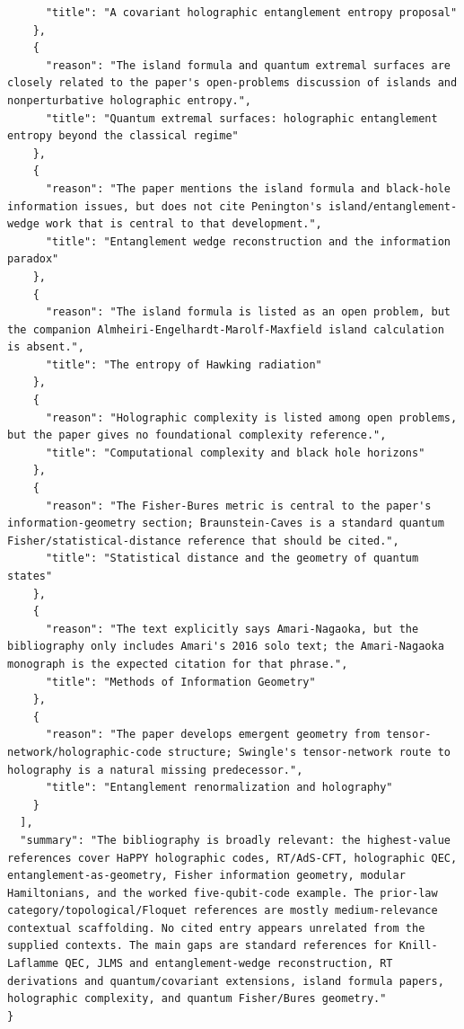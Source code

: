 \documentclass[11pt]{article}
\begin{document}
\begin{verbatim}
      "title": "A covariant holographic entanglement entropy proposal"
    },
    {
      "reason": "The island formula and quantum extremal surfaces are closely related to the paper's open-problems discussion of islands and nonperturbative holographic entropy.",
      "title": "Quantum extremal surfaces: holographic entanglement entropy beyond the classical regime"
    },
    {
      "reason": "The paper mentions the island formula and black-hole information issues, but does not cite Penington's island/entanglement-wedge work that is central to that development.",
      "title": "Entanglement wedge reconstruction and the information paradox"
    },
    {
      "reason": "The island formula is listed as an open problem, but the companion Almheiri-Engelhardt-Marolf-Maxfield island calculation is absent.",
      "title": "The entropy of Hawking radiation"
    },
    {
      "reason": "Holographic complexity is listed among open problems, but the paper gives no foundational complexity reference.",
      "title": "Computational complexity and black hole horizons"
    },
    {
      "reason": "The Fisher-Bures metric is central to the paper's information-geometry section; Braunstein-Caves is a standard quantum Fisher/statistical-distance reference that should be cited.",
      "title": "Statistical distance and the geometry of quantum states"
    },
    {
      "reason": "The text explicitly says Amari-Nagaoka, but the bibliography only includes Amari's 2016 solo text; the Amari-Nagaoka monograph is the expected citation for that phrase.",
      "title": "Methods of Information Geometry"
    },
    {
      "reason": "The paper develops emergent geometry from tensor-network/holographic-code structure; Swingle's tensor-network route to holography is a natural missing predecessor.",
      "title": "Entanglement renormalization and holography"
    }
  ],
  "summary": "The bibliography is broadly relevant: the highest-value references cover HaPPY holographic codes, RT/AdS-CFT, holographic QEC, entanglement-as-geometry, Fisher information geometry, modular Hamiltonians, and the worked five-qubit-code example. The prior-law category/topological/Floquet references are mostly medium-relevance contextual scaffolding. No cited entry appears unrelated from the supplied contexts. The main gaps are standard references for Knill-Laflamme QEC, JLMS and entanglement-wedge reconstruction, RT derivations and quantum/covariant extensions, island formula papers, holographic complexity, and quantum Fisher/Bures geometry."
}
\end{verbatim}
\end{document}
